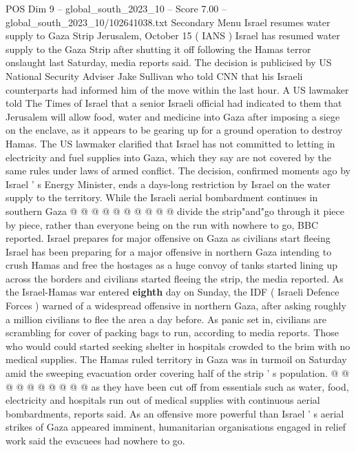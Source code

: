 \begin{textsample}{POS Dim 9 – global\_south\_2023\_10 – Score 7.00 – global\_south\_2023\_10/102641038.txt}  \label{ex:f9_pos_032}
Secondary Menu Israel resumes water supply to Gaza Strip Jerusalem, October 15 ( IANS ) Israel has resumed water supply to the Gaza Strip after shutting it off following the Hamas terror onslaught last Saturday, media reports said.
The decision is publicised by US National Security Adviser Jake Sullivan who told CNN that his Israeli counterparts had informed him of the move within the last hour.
A US lawmaker told The Times of Israel that a senior Israeli official had indicated to them that Jerusalem will allow food, water and medicine into Gaza after imposing a siege on the enclave, as it appears to be gearing up for a ground operation to destroy Hamas.
The US lawmaker clarified that Israel has not committed to letting in electricity and fuel supplies into Gaza, which they say are not covered by the same rules under laws of armed conflict.
The decision, confirmed moments ago by Israel ' s Energy Minister, ends a days-long restriction by Israel on the water supply to the territory.
While the Israeli aerial bombardment continues in southern Gaza @ @ @ @ @ @ @ @ @ @ divide the strip"and"go through it piece by piece, rather than everyone being on the run with nowhere to go, BBC reported.
Israel prepares for major offensive on Gaza as civilians start fleeing Israel has been preparing for a major offensive in northern Gaza intending to crush Hamas and free the hostages as a huge convoy of tanks started lining up across the borders and civilians started fleeing the strip, the media reported.
As the Israel-Hamas war entered \textbf{eighth} day on Sunday, the IDF ( Israeli Defence Forces ) warned of a widespread offensive in northern Gaza, after asking roughly a million civilians to flee the area a day before.
As panic set in, civilians are scrambling for cover of packing bags to run, according to media reports.
Those who would could started seeking shelter in hospitals crowded to the brim with no medical supplies.
The Hamas ruled territory in Gaza was in turmoil on Saturday amid the sweeping evacuation order covering half of the strip ' s population. @ @ @ @ @ @ @ @ @ @ as they have been cut off from essentials such as water, food, electricity and hospitals run out of medical supplies with continuous aerial bombardments, reports said.
As an offensive more powerful than Israel ' s aerial strikes of Gaza appeared imminent, humanitarian organisations engaged in relief work said the evacuees had nowhere to go.

\end{textsample}
